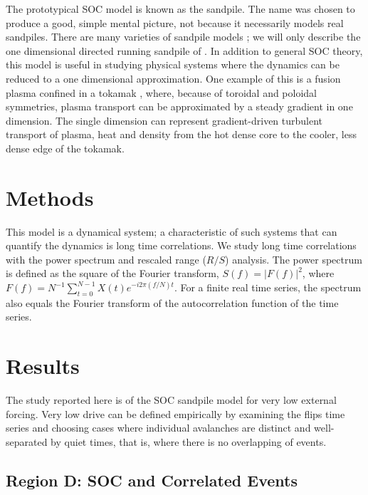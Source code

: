 The prototypical SOC model is known as the sandpile.  The name was
chosen to produce a good, simple mental picture, not because it
necessarily models real sandpiles.  There are many varieties of
sandpile models \citet{btw88a,manna1991a,jensen98a}; we will only
describe the one dimensional directed running sandpile of
\citet{hwakardar92a}. In addition to general SOC theory, this model is
useful in studying physical systems where the dynamics can be reduced
to a one dimensional approximation.  One example of this is a fusion
plasma confined in a tokamak \citet{diamond95a,newman96a}, where,
because of toroidal and poloidal symmetries, plasma transport can be
approximated by a steady gradient in one dimension.  The single
dimension can represent gradient-driven turbulent transport of plasma,
heat and density from the hot dense core to the cooler, less dense
edge of the tokamak.

\section{Methods}
\label{sec:partI_methods}

This model is a dynamical system; a characteristic of such systems
that can quantify the dynamics is long time correlations.  We study
long time correlations with the power spectrum and rescaled range
($R/S$) analysis.  The power spectrum is defined as the square of the
Fourier transform, $S(f) = \left|F(f)\right|^2$, where $F(f) = N^{-1}
\sum_{t = 0}^{N - 1} X(t) e^{-i 2 \pi (f / N) t}$.  For a finite real
time series, the spectrum also equals the Fourier transform of the
autocorrelation function of the time series.

\section{Results}
\label{sec:partI_results:-low-drive}

The study reported here is of the SOC sandpile model for very low
external forcing.  Very low drive can be defined empirically by
examining the flips time series and choosing cases where individual
avalanches are distinct and well-separated by quiet times, that is,
where there is no overlapping of events.  

\subsection{Region D:  SOC and Correlated Events}
\label{sec:partI_region-d:-soc}

